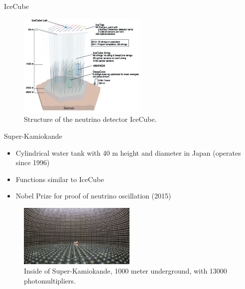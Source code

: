 \documentclass[aspectratio=1610, 10pt]{beamer}
\begin{document}
\begin{frame}{IceCube}
  \begin{figure}
    \includegraphics[width=0.55\textwidth]{images/icecube.png}
    \caption{Structure of the neutrino detector IceCube.}
  \end{figure}
\end{frame}


\begin{frame}{Super-Kamiokande}
  \begin{itemize}
    \item Cylindrical water tank with 40 m height and diameter in Japan (operates since 1996)
    \medskip
    \item Functions similar to IceCube
    \medskip
    \item Nobel Prize for proof of neutrino oscillation (2015)
  \end{itemize}
  \begin{figure}
    \includegraphics[width=0.5\textwidth]{images/kamiokande.png}
    \caption{Inside of Super-Kamiokande, 1000 meter underground, with 13000 photomultipliers.}
  \end{figure}
\end{frame}




\end{document}
